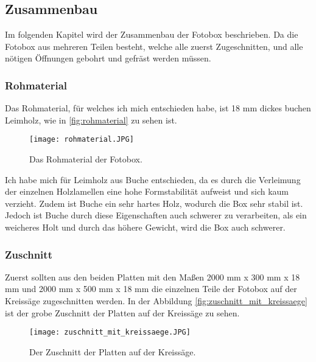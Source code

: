 \newpage

\subsection{Zusammenbau}

Im folgenden Kapitel wird der Zusammenbau der Fotobox beschrieben.
Da die Fotobox aus mehreren Teilen besteht, welche alle zuerst Zugeschnitten,
und alle nötigen Öffnungen gebohrt und gefräst werden müssen.

\subsubsection{Rohmaterial}

Das Rohmaterial, für welches ich mich entschieden habe, ist 18 mm dickes buchen
Leimholz, wie in \autoref{fig:rohmaterial} zu sehen ist.

\begin{figure}[H]
    \centering
    \texttt{[image: rohmaterial.JPG]}
    \caption{Das Rohmaterial der Fotobox.}
    \label{fig:rohmaterial}
\end{figure}

Ich habe mich für Leimholz aus Buche entschieden, da es durch die Verleimung der
einzelnen Holzlamellen eine hohe Formstabilität aufweist und sich kaum verzieht.
Zudem ist Buche ein sehr hartes Holz, wodurch die Box sehr stabil ist.
Jedoch ist Buche durch diese Eigenschaften auch schwerer zu verarbeiten,
als ein weicheres Holt und durch das höhere Gewicht, wird die Box auch schwerer.

\newpage

\subsubsection{Zuschnitt}

Zuerst sollten aus den beiden Platten mit den Maßen 2000 mm x 300 mm x 18 mm und 
2000 mm x 500 mm x 18 mm die einzelnen Teile der Fotobox auf der Kreissäge
zugeschnitten werden. In der Abbildung \autoref{fig:zuschnitt_mit_kreissaege} ist der grobe 
Zuschnitt der Platten auf der Kreissäge zu sehen.

\begin{figure}[H]
    \centering
    \texttt{[image: zuschnitt\_mit\_kreissaege.JPG]}
    \caption{Der Zuschnitt der Platten auf der Kreissäge.}
    \label{fig:zuschnitt_mit_kreissaege}
\end{figure}

